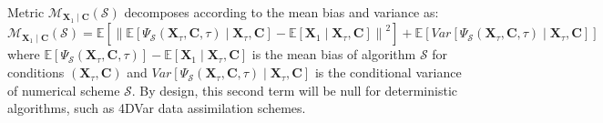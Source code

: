 \documentclass[10pt]{article}
\begin{document}
Metric $\mathcal{M}_{\mathbf{X}_1\mid \mathbf{C}}\left( \mathcal{S} \right)$ decomposes according to the mean bias and variance as:
\begin{equation}
    \label{eq: CFM metric decomposition}
    \mathcal{M}_{\mathbf{X}_1\mid \mathbf{C}}\left( \mathcal{S} \right)
    = \mathbb{E} \left [  \left \| {\mathbb{E} \left [\Psi_\mathcal{S}\left (\mathbf{X}_\tau, \mathbf{C},\tau \right )\mid \mathbf{X}_\tau,\mathbf{C} \right ] - \mathbb{E}\left [\mathbf{X}_1 \mid \mathbf{X}_\tau,\mathbf{C}\right ] }\right \|^2 \right ] + 
    \mathbb{E} \left [Var \left [  \Psi_\mathcal{S}\left (\mathbf{X}_\tau, \mathbf{C},\tau \right ) \mid \mathbf{X}_\tau,\mathbf{C} \right ] \right ]
\end{equation}
where $\mathbb{E} \left [\Psi_\mathcal{S}\left (\mathbf{X}_\tau, \mathbf{C},\tau \right ) \right ] - \mathbb{E}\left [\mathbf{X}_1 \mid \mathbf{X}_\tau,\mathbf{C}\right ]$ is the mean bias of algorithm $\mathcal{S}$ for conditions $(\mathbf{X}_\tau, \mathbf{C})$ and $Var \left [  \Psi_\mathcal{S}\left (\mathbf{X}_\tau, \mathbf{C},\tau \right ) \mid \mathbf{X}_\tau,\mathbf{C} \right ]$ is the conditional variance of  numerical scheme $\mathcal{S}$. By design, this second term will be null for deterministic algorithms, such as 4DVar data assimilation schemes. 
\end{document}
